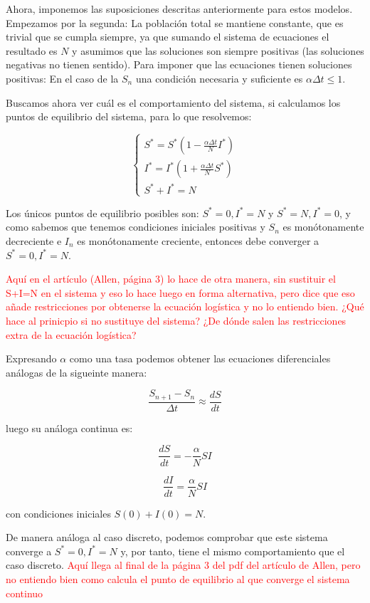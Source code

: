 Ahora, imponemos las suposiciones descritas anteriormente para estos modelos. Empezamos por la segunda: La población total se mantiene constante, que es trivial que se cumpla siempre, ya que sumando el sistema de ecuaciones el resultado es $N$ y asumimos que las soluciones son siempre positivas (las soluciones negativas no tienen sentido).
Para imponer que las ecuaciones tienen soluciones positivas:
En el caso de la $S_n$ una condición necesaria y suficiente es $\alpha\Delta t \leq 1$. 

Buscamos ahora ver cuál es el comportamiento del sistema, si calculamos los puntos de equilibrio del sistema, para lo que resolvemos:

$$
\begin{cases}
S^*=S^*\left( 1-\frac{\alpha\Delta t}{N}I^*\right) \\
I^*=I^*\left( 1+\frac{\alpha\Delta t}{N}S^*\right) \\
S^*+I^*=N
\end{cases}
$$

Los únicos puntos de equilibrio posibles son: $S^*=0, I^*=N$ y $S^*=N, I^*=0$, y como sabemos que tenemos condiciones iniciales positivas y $S_n$ es monótonamente decreciente e $I_n$ es monótonamente creciente, entonces debe converger a $S^*=0, I^*=N$.

\textcolor{red}{Aquí en el artículo (Allen, página 3) \cite{allenDiscretetimeSISIR1994} lo hace de otra manera, sin sustituir el S+I=N en el sistema y eso lo hace luego en forma alternativa, pero dice que eso añade restricciones por obtenerse la ecuación logística y no lo entiendo bien. ¿Qué hace al prinicpio si no sustituye del sistema? ¿De dónde salen las restricciones extra de la ecuación logística?}

Expresando $\alpha$ como una tasa podemos obtener las ecuaciones diferenciales análogas de la sigueinte manera:

$$\frac{S_{n+1} - S_n}{\Delta t} \approx \frac{dS}{dt}$$

luego su análoga continua es:

\begin{equation}
\frac{dS}{dt} = -\frac{\alpha}{N}SI
\end{equation}


\begin{equation}
\frac{dI}{dt} = \frac{\alpha}{N}SI
\end{equation}

con condiciones iniciales $S(0)+I(0)=N$.

De manera análoga al caso discreto, podemos comprobar que este sistema converge a $S^*=0, I^*=N$ y, por tanto, tiene el mismo comportamiento que el caso discreto.
\textcolor{red}{Aquí llega al final de la página 3 del pdf del artículo de Allen\cite{allenDiscretetimeSISIR1994}, pero no entiendo bien como calcula el punto de equilibrio al que converge el sistema continuo}

